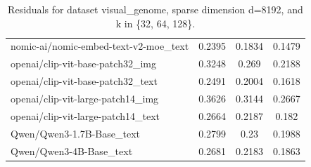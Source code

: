 \begin{table}[ht]
\begin{tabular}{lccc}
nomic-ai/nomic-embed-text-v2-moe\_text & 0.2395 & 0.1834 & 0.1479 \\
openai/clip-vit-base-patch32\_img & 0.3248 & 0.269 & 0.2188 \\
openai/clip-vit-base-patch32\_text & 0.2491 & 0.2004 & 0.1618 \\
openai/clip-vit-large-patch14\_img & 0.3626 & 0.3144 & 0.2667 \\
openai/clip-vit-large-patch14\_text & 0.2664 & 0.2187 & 0.182 \\
Qwen/Qwen3-1.7B-Base\_text & 0.2799 & 0.23 & 0.1988 \\
Qwen/Qwen3-4B-Base\_text & 0.2681 & 0.2183 & 0.1863 \\
\hline
\end{tabular}
\caption{Residuals for dataset visual\_genome, sparse dimension d=8192, and k in \{32, 64, 128\}.}
\label{tab:residuals_visual_genome_d_8192}
\end{table}
